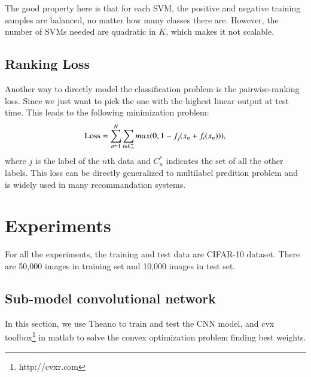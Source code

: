 \documentclass{article} %
\begin{document}
The good property here is that for each SVM, the positive and negative training samples are balanced, no matter how many classes there are. However, the number of SVMs needed are quadratic in $K$, which makes it not scalable.

\subsection{Ranking Loss}
Another way to directly model the classification problem is the pairwise-ranking loss. Since we just want to pick the one with the highest linear output at test time. This leads to the following minimization problem:
\begin{equation}
\textup{Loss} = \sum_{n=1}^{N}\sum_{i \in C_{n}^{*}}max(0, 1-f_{j}(x_{n}+f_{i}(x_{n}))),
\end{equation}
where $j$ is the label of the $n$th data and $C_{n}^{*}$ indicates the set of all the other labels. This loss can be directly generalized to multilabel predition problem and is widely used in many recommandation systems. 



\section{Experiments}
For all the experiments, the training and test data are CIFAR-10 dataset. There are 50,000 images in training set and 10,000 images in test set.
\subsection{Sub-model convolutional network}
In this section, we use Theano\cite{theano} to train and test the CNN model, and cvx toolbox\footnote{http://cvxr.com} in matlab to solve the convex optimization problem finding best weights. 
\end{document}
